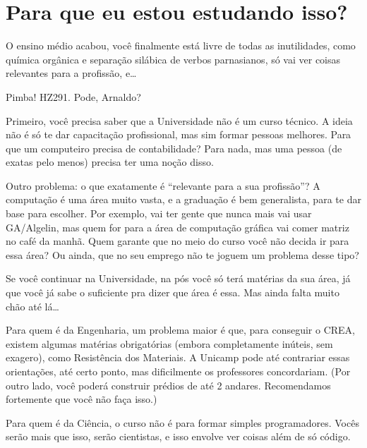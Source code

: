 
\section{Para que eu estou estudando isso?}

O ensino médio acabou, você finalmente está livre de todas as inutilidades, como
química orgânica e separação silábica de verbos parnasianos, só vai ver coisas
relevantes para a profissão, e{\dots}

Pimba! HZ291. Pode, Arnaldo?

Primeiro, você precisa saber que a Universidade não é um curso técnico. A ideia
não é só te dar capacitação profissional, mas sim formar pessoas melhores. Para
que um computeiro precisa de contabilidade? Para nada, mas uma pessoa (de exatas
pelo menos) precisa ter uma noção disso.

Outro problema: o que exatamente é ``relevante para a sua profissão''?  A
computação é uma área muito vasta, e a graduação é bem generalista, para te dar
base para escolher. Por exemplo, vai ter gente que nunca mais vai usar
GA/Algelin, mas quem for para a área de computação gráfica vai comer matriz no
café da manhã. Quem garante que no meio do curso você não decida ir para essa
área? Ou ainda, que no seu emprego não te joguem um problema desse tipo?

Se você continuar na Universidade, na pós você só terá matérias da sua área, já
que você já sabe o suficiente pra dizer que área é essa. Mas ainda falta muito
chão até lá{\dots}

Para quem é da Engenharia, um problema maior é que, para conseguir o CREA,
existem algumas matérias obrigatórias (embora completamente inúteis, sem
exagero), como Resistência dos Materiais. A Unicamp pode até contrariar essas
orientações, até certo ponto, mas dificilmente os professores concordariam. (Por
outro lado, você poderá construir prédios de até 2 andares. Recomendamos
fortemente que você não faça isso.)

Para quem é da Ciência, o curso não é para formar simples programadores. Vocês
serão mais que isso, serão cientistas, e isso envolve ver coisas além de só
código.
